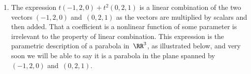 \begin{example}
\begin{enumerate}
\item 
The expression \(t(-1,2,0)+t^2(0,2,1)\)
is a linear combination of the two vectors \((-1,2,0)\) and~\((0,2,1)\) as the vectors are multiplied by scalars and then added.  
That a coefficient is a nonlinear function of some parameter is irrelevant to the property of linear combination.
This expression is the parametric description of a parabola in~\(\RR^3\), as illustrated below, and very soon we will be able to say it is a parabola in the plane spanned by \((-1,2,0)\) and~\((0,2,1)\).
\begin{center}
 {}
\end{center}

\end{enumerate}
\end{example}



